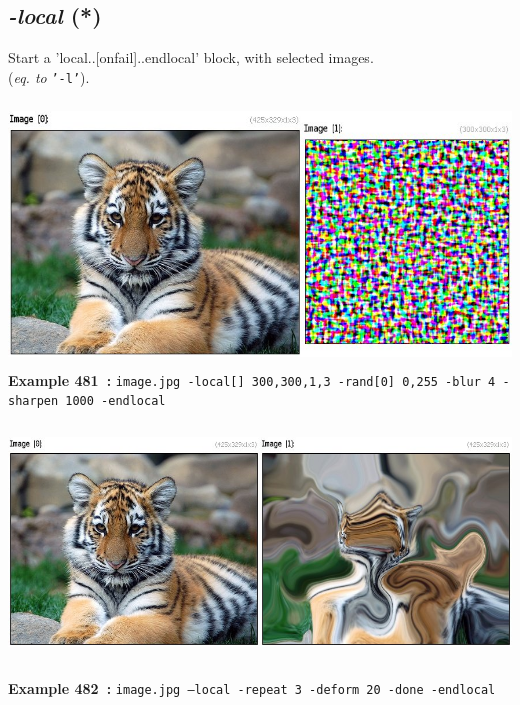 \documentclass[a4paper,11pt,twoside]{book}
\begin{document}
\subsection{\emph{-local} (*)}\vspace*{-0.5em}
Start a 'local..[onfail]..endlocal' block, with selected images.
~\\(\emph{eq. to} {\small \texttt{'-l'}}).
\begin{center}\includegraphics[keepaspectratio=true,height=7cm,width=\textwidth]{img/gmic_def481.jpg}\\
{\footnotesize \textbf{Example 481~:} \texttt{image.jpg -local[] 300,300,1,3 -rand[0] 0,255 -blur 4 -sharpen 1000 -endlocal}}
\\\includegraphics[keepaspectratio=true,height=7cm,width=\textwidth]{img/gmic_def482.jpg}\\
{\footnotesize \textbf{Example 482~:} \texttt{image.jpg --local -repeat 3 -deform 20 -done -endlocal}}
\end{center}
\end{document}
